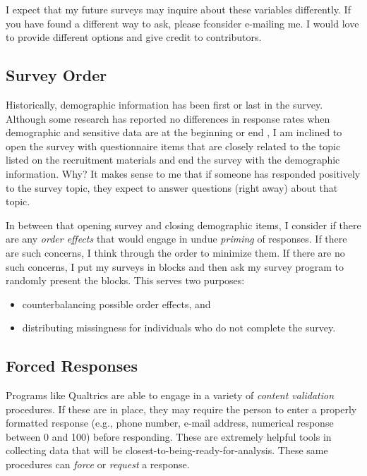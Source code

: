 \documentclass[
  english,
]{book}
\providecommand{\tightlist}{%
  \setlength{\itemsep}{0pt}\setlength{\parskip}{0pt}}
\begin{document}
I expect that my future surveys may inquire about these variables differently. If you have found a different way to ask, please fconsider e-mailing me. I would love to provide different options and give credit to contributors.

\hypertarget{survey-order}{%
\subsection{Survey Order}\label{survey-order}}

Historically, demographic information has been first or last in the survey. Although some research has reported no differences in response rates when demographic and sensitive data are at the beginning or end \citep{krathwohl_methods_2009, rowley_designing_2014}, I am inclined to open the survey with questionnaire items that are closely related to the topic listed on the recruitment materials and end the survey with the demographic information. Why? It makes sense to me that if someone has responded positively to the survey topic, they expect to answer questions (right away) about that topic.

In between that opening survey and closing demographic items, I consider if there are any \emph{order effects} that would engage in undue \emph{priming} of responses. If there are such concerns, I think through the order to minimize them. If there are no such concerns, I put my surveys in blocks and then ask my survey program to randomly present the blocks. This serves two purposes:

\begin{itemize}
\tightlist
\item
  counterbalancing possible order effects, and
\item
  distributing missingness for individuals who do not complete the survey.
\end{itemize}

\hypertarget{forced-responses}{%
\subsection{Forced Responses}\label{forced-responses}}

Programs like Qualtrics are able to engage in a variety of \emph{content validation} procedures. If these are in place, they may require the person to enter a properly formatted response (e.g., phone number, e-mail address, numerical response between 0 and 100) before responding. These are extremely helpful tools in collecting data that will be closest-to-being-ready-for-analysis. These same procedures can \emph{force} or \emph{request} a response.
\end{document}
